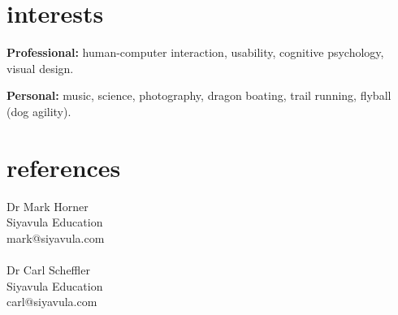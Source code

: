 \documentclass[]{friggeri-cv} %
\begin{document}

\section{interests}

\textbf{Professional:} human-computer interaction, usability, cognitive psychology, visual design.

\textbf{Personal:} music, science, photography, dragon boating, trail running, flyball (dog agility).


\section{references}

Dr Mark Horner\\
Siyavula Education\\
mark@siyavula.com\\
\\
Dr Carl Scheffler\\
Siyavula Education\\
carl@siyavula.com\\
\end{document}
